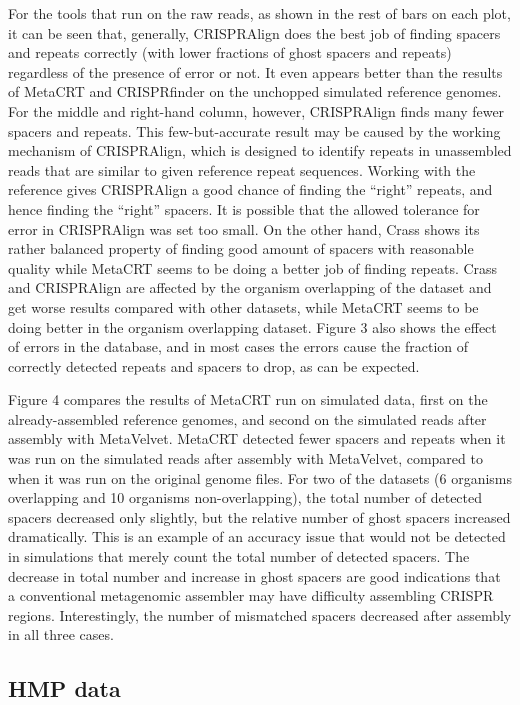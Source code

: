 \documentclass{bmcart}
\begin{document}
For the tools that run on the raw reads, as shown in the rest of bars on each plot, it can be seen that, generally, CRISPRAlign does the best job of finding spacers and repeats correctly (with lower fractions of ghost spacers and repeats) regardless of the presence of error or not. It even appears better than the results of MetaCRT and CRISPRfinder on the unchopped simulated reference genomes. For the middle and right-hand column, however, CRISPRAlign finds many fewer spacers and repeats. This few-but-accurate result may be caused by the working mechanism of CRISPRAlign, which is designed to identify repeats in unassembled reads that are similar to given reference repeat sequences. Working with the reference gives CRISPRAlign a good chance of finding the “right” repeats, and hence finding the “right” spacers. It is possible that the allowed tolerance for error in CRISPRAlign was set too small. On the other hand, Crass shows its rather balanced property of finding good amount of spacers with reasonable quality while MetaCRT seems to be doing a better job of finding repeats. Crass and CRISPRAlign are affected by the organism overlapping of the dataset and get worse results compared with other datasets, while MetaCRT seems to be doing better in the organism overlapping dataset. Figure 3 also shows the effect of errors in the database, and in most cases the errors cause the fraction of correctly detected repeats and spacers to drop, as can be expected.

Figure 4 compares the results of MetaCRT run on simulated data, first on the already-assembled reference genomes, and second on the simulated reads after assembly with MetaVelvet. MetaCRT detected fewer spacers and repeats when it was run on the simulated reads after assembly with MetaVelvet, compared to when it was run on the original genome files. For two of the datasets (6 organisms overlapping and 10 organisms non-overlapping), the total number of detected spacers decreased only slightly, but the relative number of ghost spacers increased dramatically. This is an example of an accuracy issue that would not be detected in simulations that merely count the total number of detected spacers. The decrease in total number and increase in ghost spacers are good indications that a conventional metagenomic assembler may have difficulty assembling CRISPR regions. Interestingly, the number of mismatched spacers decreased after assembly in all three cases. 

\subsection*{HMP data}
\end{document}
